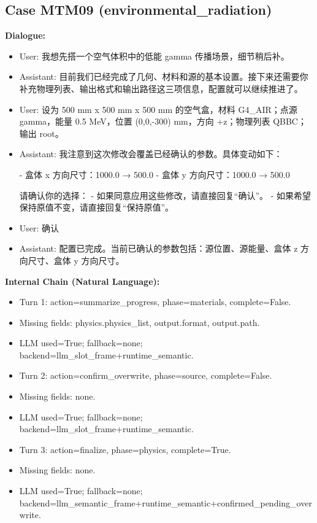 \documentclass[11pt]{ctexart}
\begin{document}
\subsection{Case MTM09 (environmental\_radiation)}
\textbf{Dialogue:}
\begin{itemize}
\item User: 我想先搭一个空气体积中的低能 gamma 传播场景，细节稍后补。
\item Assistant: 目前我们已经完成了几何、材料和源的基本设置。接下来还需要你补充物理列表、输出格式和输出路径这三项信息，配置就可以继续推进了。
\item User: 设为 500 mm x 500 mm x 500 mm 的空气盒，材料 G4\_AIR；点源 gamma，能量 0.5 MeV，位置 (0,0,-300) mm，方向 +z；物理列表 QBBC；输出 root。
\item Assistant: 我注意到这次修改会覆盖已经确认的参数。具体变动如下：

- 盒体 x 方向尺寸：1000.0 → 500.0
- 盒体 y 方向尺寸：1000.0 → 500.0

请确认你的选择：
- 如果同意应用这些修改，请直接回复“确认”。
- 如果希望保持原值不变，请直接回复“保持原值”。
\item User: 确认
\item Assistant: 配置已完成。当前已确认的参数包括：源位置、源能量、盒体 z 方向尺寸、盒体 y 方向尺寸。
\end{itemize}
\textbf{Internal Chain (Natural Language):}
\begin{itemize}
\item Turn 1: action=summarize\_progress, phase=materials, complete=False.
\item Missing fields: physics.physics\_list, output.format, output.path.
\item LLM used=True; fallback=none; backend=llm\_slot\_frame+runtime\_semantic.
\item Turn 2: action=confirm\_overwrite, phase=source, complete=False.
\item Missing fields: none.
\item LLM used=True; fallback=none; backend=llm\_slot\_frame+runtime\_semantic.
\item Turn 3: action=finalize, phase=physics, complete=True.
\item Missing fields: none.
\item LLM used=True; fallback=none; backend=llm\_semantic\_frame+runtime\_semantic+confirmed\_pending\_overwrite.
\end{itemize}
\end{document}
